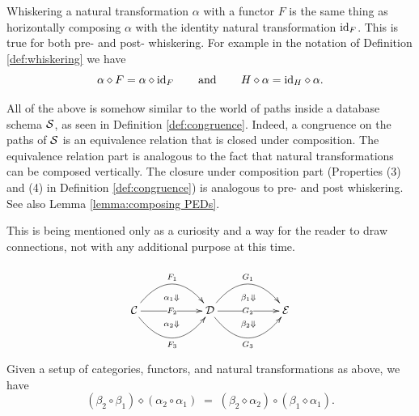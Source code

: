 \documentclass[CT4S-EN-RU]{subfiles}
\begin{document}
\begin{definitionRUS}\label{def:horizontal comp of nt}
\end{definitionRUS}

\begin{remarkENG}
Whiskering a natural transformation $\alpha$ with a functor $F$ is the same thing as horizontally composing $\alpha$ with the identity natural transformation $\textnormal{id}_F$. This is true for both pre- and post- whiskering. For example in the notation of Definition \ref{def:whiskering} we have 
$$\alpha\diamond F = \alpha\diamond\textnormal{id}_F\hspace{.3in}\textnormal{and}\hspace{.3in} H\diamond\alpha=\textnormal{id}_H\diamond\alpha.$$
\end{remarkENG}

\begin{remarkRUS}
\end{remarkRUS}

\begin{remarkENG}
All of the above is somehow similar to the world of paths inside a database schema $\mathcal{S}$, as seen in Definition \ref{def:congruence}. Indeed, a congruence on the paths of $\mathcal{S}$ is an equivalence relation that is closed under composition. The equivalence relation part is analogous to the fact that natural transformations can be composed vertically. The closure under composition part (Properties (3) and (4) in Definition \ref{def:congruence}) is analogous to pre- and post whiskering. See also Lemma \ref{lemma:composing PEDs}. 

This is being mentioned only as a curiosity and a way for the reader to draw connections, not with any additional purpose at this time.
\end{remarkENG}

\begin{remarkRUS}
\end{remarkRUS}

\begin{theoremENG}
$$
\xymatrix{
&\ar@{}[d]|(.65){\alpha_1\Down}&&\ar@{}[d]|(.65){\beta_1\Down}\\
\mcC\ar@/^2pc/[rr]^{F_1}\ar[rr]|{F_2}\ar@/_2pc/[rr]_{F_3}&&\mcD\ar@/^2pc/[rr]^{G_1}\ar[rr]|{G_2}\ar@/_2pc/[rr]_{G_3}&&\mcE\\
&\ar@{}[u]|(.65){\alpha_2\Down}&&\ar@{}[u]|(.65){\beta_2\Down}}
$$
Given a setup of categories, functors, and natural transformations as above, we have
$$(\beta_2\circ\beta_1)\diamond(\alpha_2\circ\alpha_1)\;=\;(\beta_2\diamond\alpha_2)\circ(\beta_1\diamond\alpha_1).$$
\end{theoremENG}
\end{document}
